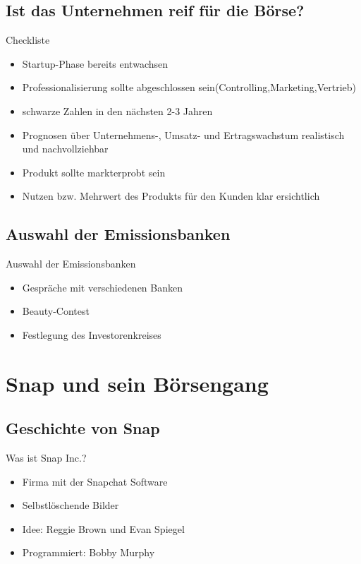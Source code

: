 \documentclass{beamer}
\begin{document}
\subsection{Ist das Unternehmen reif für die Börse?}
\begin{frame} {Checkliste}
\begin{itemize}
	\item Startup-Phase bereits entwachsen  
	\item Professionalisierung sollte abgeschlossen sein(Controlling,Marketing,Vertrieb)  
	\item schwarze Zahlen in den nächsten 2-3 Jahren   
	\item Prognosen über Unternehmens-, Umsatz- und Ertragswachstum realistisch und nachvollziehbar 
	 \item Produkt sollte markterprobt sein 
	 \item Nutzen bzw. Mehrwert des Produkts für den Kunden  klar ersichtlich 
\end{itemize}
\end{frame}

\subsection{Auswahl der Emissionsbanken}
\begin{frame} {Auswahl der Emissionsbanken}
\begin{itemize}
	\item Gespräche mit verschiedenen Banken 
	\item  Beauty-Contest
	\item  Festlegung des Investorenkreises

\end{itemize}
\end{frame}


\section{Snap und sein Börsengang}

\subsection{Geschichte von Snap}
\begin{frame} {Was ist Snap Inc.?}
\begin{itemize}
	\item Firma mit der Snapchat Software 
	\item  Selbstlöschende Bilder
	\item  Idee: Reggie Brown und Evan Spiegel
	\item  Programmiert: Bobby Murphy
\end{itemize}
\end{frame}
\end{document}
